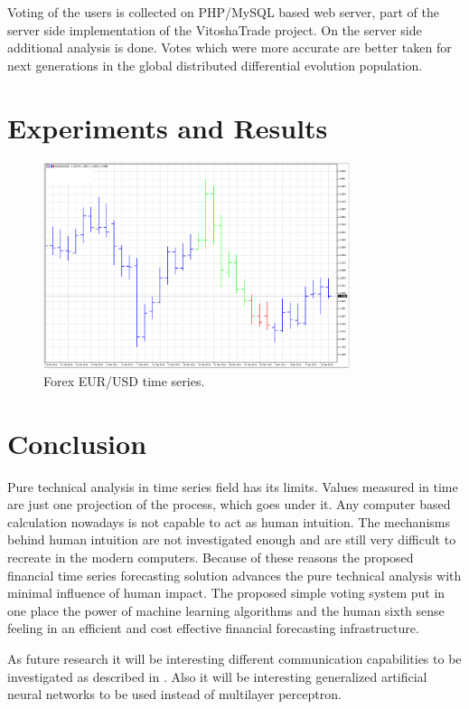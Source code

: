 \documentclass[11pt]{article}
\begin{document}
Voting of the users is collected on PHP/MySQL based web server\cite{tomov01}, part of the server side implementation of the VitoshaTrade project. On the server side additional analysis is done. Votes which were more accurate are better taken for next generations in the global distributed differential evolution population. 

\section{Experiments and Results} \label{Experiments and Results}

\begin{figure}
\includegraphics[width=0.8\textwidth]{fig03.png}
\centering
\caption{Forex EUR/USD time series.} \label{fig03}
\end{figure}
\FloatBarrier

\section{Conclusion} \label{Conclusion}

Pure technical analysis in time series field has its limits. Values measured in time are just one projection of the process, which goes under it. Any computer based calculation nowadays is not capable to act as human intuition. The mechanisms behind human intuition are not investigated enough and are still very difficult to recreate in the modern computers. Because of these reasons the proposed financial time series forecasting solution advances the pure technical analysis with minimal influence of human impact. The proposed simple voting system put in one place the power of machine learning algorithms and the human sixth sense feeling in an efficient and cost effective financial forecasting infrastructure.

As future research it will be interesting different communication capabilities to be investigated as described in \cite{alexandrov01}. Also it will be interesting generalized artificial neural networks \cite{tashev01} to be used instead of multilayer perceptron.
\end{document}
